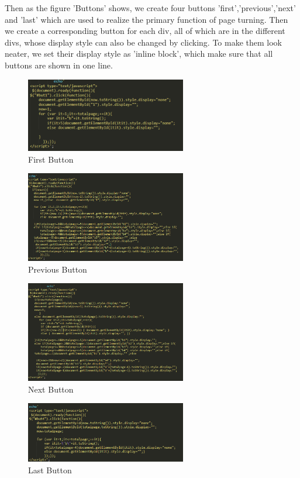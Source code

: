 \documentclass{book}
\begin{document}
Then as the figure 'Buttons' shows, we create four buttons 'first','previous','next' and 'last' which are used to realize the primary function of page turning. Then we create a corresponding button for each div, all of which are in the different divs, whose display style can also be changed by clicking. To make them look neater, we set their display style as 'inline block', which make sure that all buttons are shown in one line.

\begin{figure}[htbp]
\centering
\includegraphics[width=7.0cm]{img/dsw_first1.png}
\caption{First Button}
\end{figure}

\begin{figure}[htbp]
\centering
\includegraphics[width=7.0cm]{img/dsw_pr1.png}
\caption{Previous Button}
\end{figure}

\begin{figure}[htbp]
\centering
\includegraphics[width=7.0cm]{img/dsw_next1.png}
\caption{Next Button}
\end{figure}

\begin{figure}[htbp]
\centering
\includegraphics[width=7.0cm]{img/dsw_last1.png}
\caption{Last Button}
\end{figure}
\end{document}
